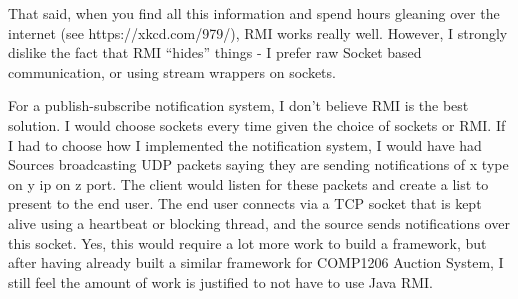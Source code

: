 \documentclass[a4paper]{article}
\begin{document}
That said, when you find all this information and spend hours gleaning over the internet (see https://xkcd.com/979/),
RMI works really well.
However, I strongly dislike the fact that RMI ``hides'' things - I prefer raw Socket based communication, or using stream wrappers on sockets.

For a publish-subscribe notification system, I don't believe RMI is the best solution.
I would choose sockets every time given the choice  of sockets or RMI.
If I had to choose how I implemented the notification system, I would have had Sources broadcasting UDP packets saying they are sending notifications of x type on y ip on z port.
The client would listen for these packets and create a list to present to the end user.
The end user connects via a TCP socket that is kept alive using a heartbeat or blocking thread, and the source sends notifications over this socket.
Yes, this would require a lot more work to build a framework, but after having already built a similar framework for COMP1206 Auction System,
I still feel the amount of work is justified to not have to use Java RMI.
\end{document}
